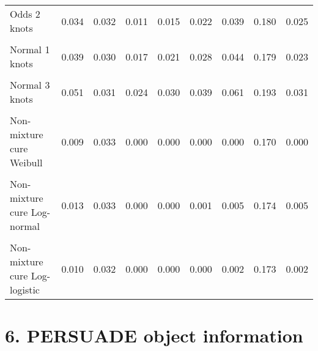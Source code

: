 \documentclass[
]{article}
\begin{document}
\begin{table}[H]
{\begin{tabular}[t]{lrrrrrrrr}
Odds 2 knots & 0.034 & 0.032 & 0.011 & 0.015 & 0.022 & 0.039 & 0.180 & 0.025\\
\cellcolor{gray!10}{Odds 3 knots} & \cellcolor{gray!10}{0.040} & \cellcolor{gray!10}{0.034} & \cellcolor{gray!10}{0.013} & \cellcolor{gray!10}{0.018} & \cellcolor{gray!10}{0.026} & \cellcolor{gray!10}{0.047} & \cellcolor{gray!10}{0.193} & \cellcolor{gray!10}{0.030}\\
Normal 1 knots & 0.039 & 0.030 & 0.017 & 0.021 & 0.028 & 0.044 & 0.179 & 0.023\\
\cellcolor{gray!10}{Normal 2 knots} & \cellcolor{gray!10}{0.040} & \cellcolor{gray!10}{0.030} & \cellcolor{gray!10}{0.018} & \cellcolor{gray!10}{0.022} & \cellcolor{gray!10}{0.029} & \cellcolor{gray!10}{0.046} & \cellcolor{gray!10}{0.177} & \cellcolor{gray!10}{0.024}\\
Normal 3 knots & 0.051 & 0.031 & 0.024 & 0.030 & 0.039 & 0.061 & 0.193 & 0.031\\
\cellcolor{gray!10}{Mixture cure Weibull} & \cellcolor{gray!10}{0.009} & \cellcolor{gray!10}{0.032} & \cellcolor{gray!10}{0.000} & \cellcolor{gray!10}{0.000} & \cellcolor{gray!10}{0.000} & \cellcolor{gray!10}{0.000} & \cellcolor{gray!10}{0.168} & \cellcolor{gray!10}{0.000}\\
Non-mixture cure Weibull & 0.009 & 0.033 & 0.000 & 0.000 & 0.000 & 0.000 & 0.170 & 0.000\\
\cellcolor{gray!10}{Mixture cure Log-normal} & \cellcolor{gray!10}{0.012} & \cellcolor{gray!10}{0.033} & \cellcolor{gray!10}{0.000} & \cellcolor{gray!10}{0.000} & \cellcolor{gray!10}{0.000} & \cellcolor{gray!10}{0.003} & \cellcolor{gray!10}{0.172} & \cellcolor{gray!10}{0.003}\\
Non-mixture cure Log-normal & 0.013 & 0.033 & 0.000 & 0.000 & 0.001 & 0.005 & 0.174 & 0.005\\
\cellcolor{gray!10}{Mixture cure Log-logistic} & \cellcolor{gray!10}{0.011} & \cellcolor{gray!10}{0.032} & \cellcolor{gray!10}{0.000} & \cellcolor{gray!10}{0.000} & \cellcolor{gray!10}{0.000} & \cellcolor{gray!10}{0.002} & \cellcolor{gray!10}{0.173} & \cellcolor{gray!10}{0.002}\\
Non-mixture cure Log-logistic & 0.010 & 0.032 & 0.000 & 0.000 & 0.000 & 0.002 & 0.173 & 0.002\\
\bottomrule
\end{tabular}}
\end{table}

\clearpage

\section{6. PERSUADE object
information}\label{persuade-object-information}
\end{document}
